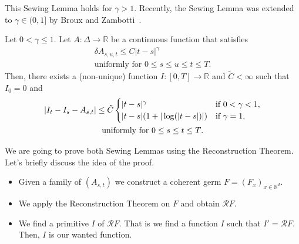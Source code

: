 This Sewing Lemma holds for \( \gamma > 1 \). Recently, the Sewing Lemma was extended to \( \gamma \in (0,1] \) by Broux and Zambotti~\cite{broux2021sewing}. 

\begin{lemma}
  Let \(0 < \gamma \leq 1\). Let \( A: \Delta \to \mathbb{R} \) be a continuous function that satisfies 
  \begin{gather*}
      \delta A_{s,u,t} \leq C {|t-s|}^\gamma\\
      \text{uniformly for \(0 \leq s \leq u \leq t \leq T\)}. \nonumber
  \end{gather*} 
  Then, there exists a (non-unique) function \(I: [0,T] \to \mathbb{R}\) and \(\tilde C < {\infty}\)  such that \(I_0 = 0\) and 
  \begin{gather*}
      |I_t - I_s - A_{s,t}| \leq \tilde C \begin{cases}
        |t-s|^\gamma \quad & \text{if \( 0 < \gamma < 1, \)}\\
        |t-s|(1 + |\log(|t-s|)|) & \text{if \( \gamma = 1 \)},
      \end{cases}\\
      \text{uniformly for \( 0 \leq s \leq t \leq T \)}.
  \end{gather*}  
\end{lemma}

We are going to prove both Sewing Lemmas using the Reconstruction Theorem. Let's briefly discuss the idea of the proof.

\begin{itemize}
  \item Given a family of \( (A_{s,t}) \) we construct a coherent germ \( F = (F_x)_{x \in \mathbb{R}^d} \).
  \item We apply the Reconstruction Theorem on \( F \) and obtain \( \mathcal{R}F \).
  \item We find a primitive \( I \) of \( \mathcal{R}F \). That is we find a function \( I \) such that \( I' = \mathcal{R}F \). Then, \( I \) is our wanted function.
\end{itemize}

